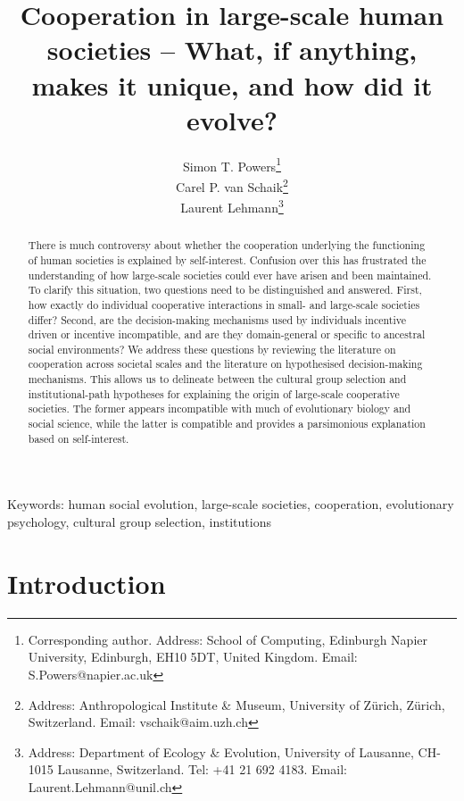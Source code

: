 \documentclass[10pt, a4paper, fleqn]{article}
\begin{document}
\title{Cooperation in large-scale human societies -- What, if anything, makes it unique, and how did it evolve?}
\author{Simon T. Powers\thanks{Corresponding author. Address: School of Computing, Edinburgh Napier University, Edinburgh, EH10 5DT, United Kingdom. Email: S.Powers@napier.ac.uk}
\\
Carel P. van Schaik\thanks{Address: Anthropological Institute \& Museum, University of Z\"{u}rich, Z\"{u}rich, Switzerland. Email: vschaik@aim.uzh.ch}
\\
Laurent Lehmann\thanks{Address: Department of Ecology \& Evolution, University of Lausanne, CH-1015 Lausanne, Switzerland. Tel: +41 21 692 4183. Email: Laurent.Lehmann@unil.ch}}
\maketitle
\date{}

\newpage
\linenumbers 
\begin{abstract}

There is much controversy about whether the cooperation underlying the functioning of human societies is explained by self-interest. Confusion over this has frustrated the understanding of how large-scale societies could ever have arisen and been maintained. To clarify this situation, two questions need to be distinguished and answered. First, how exactly do individual cooperative interactions in small- and large-scale societies differ? Second, are the decision-making mechanisms used by individuals incentive driven or incentive incompatible, and are they domain-general or specific to ancestral social environments? We address these questions by reviewing the literature on cooperation across societal scales and the literature on hypothesised decision-making mechanisms. This allows us to delineate between the cultural group selection and institutional-path hypotheses for explaining the origin of large-scale cooperative societies. The former appears incompatible with much of evolutionary biology and social science, while the latter is compatible and provides a parsimonious explanation based on self-interest.
 
\end{abstract}

\noindent Keywords: human social evolution, large-scale societies, cooperation, evolutionary psychology, cultural group selection, institutions 

\newpage

\section*{Introduction}
\end{document}
